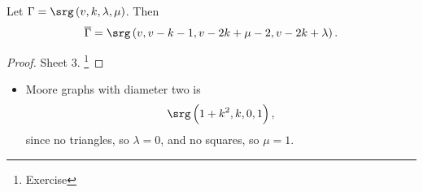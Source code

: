 \begin{proposition}
Let $ \Gamma = \srg\br{v, k, \lambda, \mu} $. Then
$$ \overline{\Gamma} = \srg\br{v, v - k - 1, v - 2k + \mu - 2, v - 2k + \lambda}. $$
\end{proposition}

\begin{proof}
Sheet $ 3 $. \footnote{Exercise}
\end{proof}

\begin{example*}
\hfill
\begin{itemize}
\item Moore graphs with diameter two is
$$ \srg\br{1 + k^2, k, 0, 1}, $$
since no triangles, so $ \lambda = 0 $, and no squares, so $ \mu = 1 $.

\pagebreak


\end{itemize}
\end{example*}
